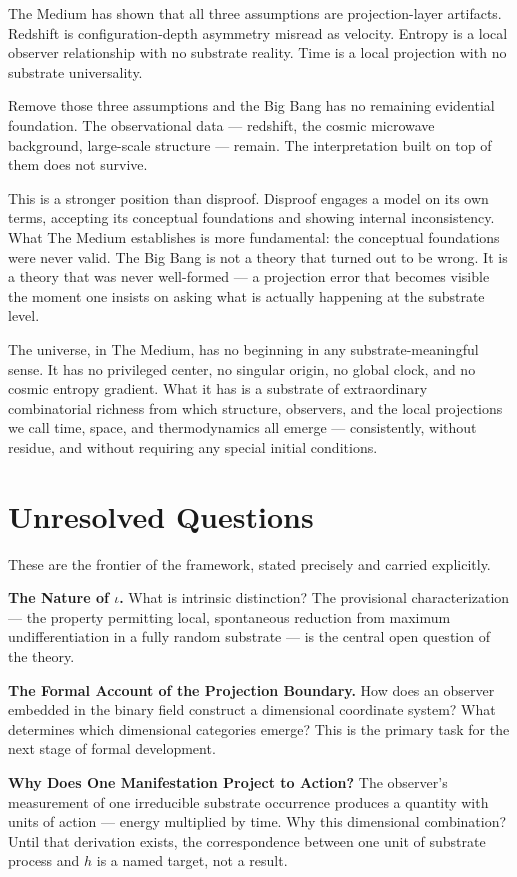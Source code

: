\documentclass[11pt,letterpaper]{article}
\begin{document}
The Medium has shown that all three assumptions are projection-layer artifacts. Redshift is configuration-depth asymmetry misread as velocity. Entropy is a local observer relationship with no substrate reality. Time is a local projection with no substrate universality.

Remove those three assumptions and the Big Bang has no remaining evidential foundation. The observational data --- redshift, the cosmic microwave background, large-scale structure --- remain. The interpretation built on top of them does not survive.

This is a stronger position than disproof. Disproof engages a model on its own terms, accepting its conceptual foundations and showing internal inconsistency. What The Medium establishes is more fundamental: the conceptual foundations were never valid. The Big Bang is not a theory that turned out to be wrong. It is a theory that was never well-formed --- a projection error that becomes visible the moment one insists on asking what is actually happening at the substrate level.

The universe, in The Medium, has no beginning in any substrate-meaningful sense. It has no privileged center, no singular origin, no global clock, and no cosmic entropy gradient. What it has is a substrate of extraordinary combinatorial richness from which structure, observers, and the local projections we call time, space, and thermodynamics all emerge --- consistently, without residue, and without requiring any special initial conditions.
\section{Unresolved Questions}
\label{sec:orgab5286d}

These are the frontier of the framework, stated precisely and carried explicitly.

\textbf{The Nature of \(\iota\).} What is intrinsic distinction? The provisional characterization --- the property permitting local, spontaneous reduction from maximum undifferentiation in a fully random substrate --- is the central open question of the theory.

\textbf{The Formal Account of the Projection Boundary.} How does an observer embedded in the binary field construct a dimensional coordinate system? What determines which dimensional categories emerge? This is the primary task for the next stage of formal development.

\textbf{Why Does One Manifestation Project to Action?} The observer's measurement of one irreducible substrate occurrence produces a quantity with units of action --- energy multiplied by time. Why this dimensional combination? Until that derivation exists, the correspondence between one unit of substrate process and \(h\) is a named target, not a result.
\end{document}
